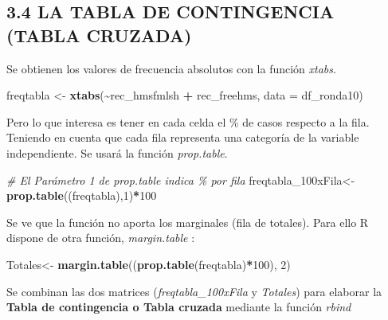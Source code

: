 \documentclass[
  12 pt,
  a4paper,
]{article}
\newenvironment{Shaded}{\begin{snugshade}}{\end{snugshade}}
\newcommand{\AttributeTok}[1]{\textcolor[rgb]{0.13,0.29,0.53}{#1}}
\newcommand{\CommentTok}[1]{\textcolor[rgb]{0.56,0.35,0.01}{\textit{#1}}}
\newcommand{\DecValTok}[1]{\textcolor[rgb]{0.00,0.00,0.81}{#1}}
\newcommand{\FunctionTok}[1]{\textcolor[rgb]{0.13,0.29,0.53}{\textbf{#1}}}
\newcommand{\NormalTok}[1]{#1}
\newcommand{\OtherTok}[1]{\textcolor[rgb]{0.56,0.35,0.01}{#1}}
\newcommand{\SpecialCharTok}[1]{\textcolor[rgb]{0.81,0.36,0.00}{\textbf{#1}}}
\begin{document}
\subsection{3.4 LA TABLA DE CONTINGENCIA (TABLA
CRUZADA)}\label{la-tabla-de-contingencia-tabla-cruzada}

Se obtienen los valores de frecuencia absolutos con la función
\emph{xtabs}.

\begin{Shaded}
\begin{Highlighting}[]
\NormalTok{freqtabla }\OtherTok{\textless{}{-}} \FunctionTok{xtabs}\NormalTok{(}\SpecialCharTok{\textasciitilde{}}\NormalTok{rec\_hmsfmlsh }\SpecialCharTok{+}\NormalTok{ rec\_freehms, }\AttributeTok{data =}\NormalTok{ df\_ronda10)}
\end{Highlighting}
\end{Shaded}

Pero lo que interesa es tener en cada celda el \% de casos respecto a la
fila. Teniendo en cuenta que cada fila representa una categoría de la
variable independiente. Se usará la función \emph{prop.table}.

\begin{Shaded}
\begin{Highlighting}[]
\CommentTok{\# El Parámetro 1 de prop.table indica  \% por fila}
\NormalTok{freqtabla\_100xFila}\OtherTok{\textless{}{-}}\FunctionTok{prop.table}\NormalTok{((freqtabla),}\DecValTok{1}\NormalTok{)}\SpecialCharTok{*}\DecValTok{100} 
\end{Highlighting}
\end{Shaded}

Se ve que la función no aporta los marginales (fila de totales). Para
ello R dispone de otra función, \emph{margin.table} :

\begin{Shaded}
\begin{Highlighting}[]
\NormalTok{Totales}\OtherTok{\textless{}{-}} \FunctionTok{margin.table}\NormalTok{((}\FunctionTok{prop.table}\NormalTok{(freqtabla)}\SpecialCharTok{*}\DecValTok{100}\NormalTok{), }\DecValTok{2}\NormalTok{)}
\end{Highlighting}
\end{Shaded}

Se combinan las dos matrices (\emph{freqtabla\_100xFila} y
\emph{Totales}) para elaborar la \textbf{Tabla de contingencia o Tabla
cruzada} mediante la función \emph{rbind}
\end{document}
